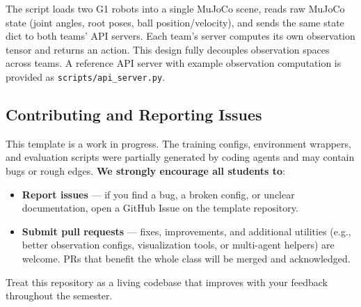 \documentclass{article}
\begin{document}
The script loads two G1 robots into a single MuJoCo scene, reads raw MuJoCo state (joint angles, root poses, ball position/velocity), and sends the same state dict to both teams' API servers. Each team's server computes its own observation tensor and returns an action. This design fully decouples observation spaces across teams. A reference API server with example observation computation is provided as \texttt{scripts/api\_server.py}.

\subsection{Contributing and Reporting Issues}

This template is a work in progress. The training configs, environment wrappers, and evaluation scripts were partially generated by coding agents and may contain bugs or rough edges. \textbf{We strongly encourage all students to}:
\begin{itemize}
    \item \textbf{Report issues} --- if you find a bug, a broken config, or unclear documentation, open a GitHub Issue on the template repository.
    \item \textbf{Submit pull requests} --- fixes, improvements, and additional utilities (e.g., better observation configs, visualization tools, or multi-agent helpers) are welcome. PRs that benefit the whole class will be merged and acknowledged.
\end{itemize}

Treat this repository as a living codebase that improves with your feedback throughout the semester.

{


}
\end{document}
